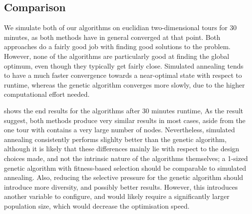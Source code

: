 \documentclass[10pt, twocolumn]{article}\usepackage[]{graphicx}\usepackage[]{color}
\theoremstyle{plain}
\begin{document}
  \subsection{Comparison}
  We simulate both of our algorithms on euclidian two-dimensional tours for 30 minutes, as both methods have in general converged at that point. Both approaches do a fairly good job with finding good solutions to the problem. However, none of the algorithms are particularly good at finding the global optimum, even though they typically get fairly close. Simulated annealing tends to have a much faster convergence towards a near-optimal state with respect to runtime, whereas the genetic algorithm converges more slowly, due to the higher computational effort needed. 
  
 shows the end results for the algorithms after 30 minutes runtime,  As the result suggest, both methods produce very similar results in most cases, aside from the one tour with contains a very large number of nodes. Nevertheless, simulated annealing consistently performs slighlty better than the genetic algorithm, although it is likely that these differences mainly lie with respect to the design choices made, and not the intrinsic nature of the algorithms themselves; a 1-sized genetic algorithm with fitness-based selection should be comparable to simulated annealing. Also, reducing the selective pressure for the genetic algorithm should introduce more diversity, and possibly better results. However, this introduces another variable to configure, and would likely require a significantly larger population size, which would decrease the optimisation speed. 
  
\end{document}
